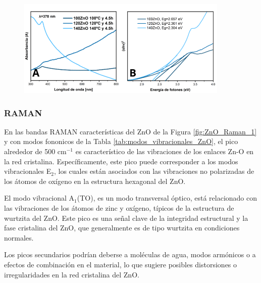 \documentclass[12pt]{article}
\begin{document}
 \begin{figure}[H]
    	   \begin{center}
     	  	\includegraphics[width = 0.9\textwidth]{Imagenes/ZnO_uv.png}
    	   \end{center} 
        \end{figure}

 \subsubsection{RAMAN}
 En las bandas RAMAN características del ZnO de la Figura \ref{fig:ZnO_Raman_1} y con modos fononicos de la Tabla \ref{tab:modos_vibracionales_ZnO}, el pico alrededor de 500 cm$\displaystyle ^{-1}$ es característico de las vibraciones de los enlaces Zn-O en la red cristalina. Específicamente, este pico puede corresponder a los modos vibracionales E$\displaystyle _{2}$, los cuales están asociados con las vibraciones no polarizadas de los átomos de oxígeno en la estructura hexagonal del ZnO.\vspace{1em} %

El modo vibracional A$\displaystyle _{1}$(TO), es un modo transversal óptico, está relacionado con las vibraciones de los átomos de zinc y oxígeno, típicos de la estructura de wurtzita del ZnO.
Este pico es una señal clave de la integridad estructural y la fase cristalina del ZnO, que generalmente es de tipo wurtzita en condiciones normales.\vspace{1em} %

Los picos secundarios podrían deberse a moléculas de agua, modos armónicos o a efectos de combinación en el material, lo que sugiere posibles distorsiones o irregularidades en la red cristalina del ZnO.
\end{document}

